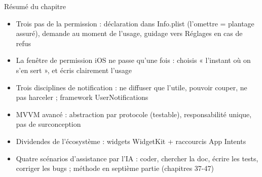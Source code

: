 \begin{tcbsummary}{Résumé du chapitre}
\begin{itemize}
  \item Trois pas de la permission : déclaration dans Info.plist (l'omettre = plantage assuré), demande au moment de l'usage, guidage vers Réglages en cas de refus
  \item La fenêtre de permission iOS ne passe qu'une fois : choisis « l'instant où on s'en sert », et écris clairement l'usage
  \item Trois disciplines de notification : ne diffuser que l'utile, pouvoir couper, ne pas harceler ; framework UserNotifications
  \item MVVM avancé : abstraction par protocole (testable), responsabilité unique, pas de surconception
  \item Dividendes de l'écosystème : widgets WidgetKit + raccourcis App Intents
  \item Quatre scénarios d'assistance par l'IA : coder, chercher la doc, écrire les tests, corriger les bugs ; méthode en septième partie (chapitres 37-47)
\end{itemize}

\end{tcbsummary}
